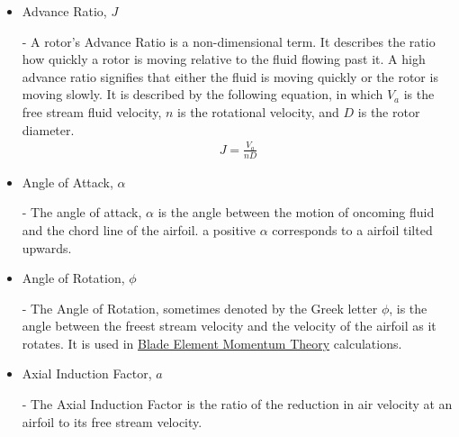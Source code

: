 \documentclass{article}
\begin{document}
\begin{itemize}
	
	\item \hypertarget{J}{Advance Ratio, $J$} - A rotor's Advance Ratio is a non-dimensional term. It describes the ratio how quickly a rotor is moving relative to the fluid flowing past it. A high advance ratio signifies that either the fluid is moving quickly or the rotor is moving slowly. It is described by the following equation, in which $V_{a}$ is the free stream fluid velocity, $n$ is the rotational velocity, and $D$ is the rotor diameter.
	\begin{equation}
	\begin{aligned}
		J = \frac{V_{a}}{n D}
	\end{aligned}
	\end{equation}
		
	\item \hypertarget{alpha}{Angle of Attack, $\alpha$} - The angle of attack, $\alpha$ is the angle between the motion of oncoming fluid and the chord line of the airfoil. a positive $\alpha$ corresponds to a airfoil tilted upwards.
	
	\item \hypertarget{phi}{Angle of Rotation, $\phi$} - The Angle of Rotation, sometimes denoted by the Greek letter $\phi$, is the angle between the freest stream velocity and the velocity of the airfoil as it rotates. It is used in \hyperlink{BEM}{Blade Element Momentum Theory} calculations.

	\item \hypertarget{a}{Axial Induction Factor, $a$} - The Axial Induction Factor is the ratio of the reduction in air velocity at an airfoil to its free stream velocity.
	

\end{itemize}
\end{document}
